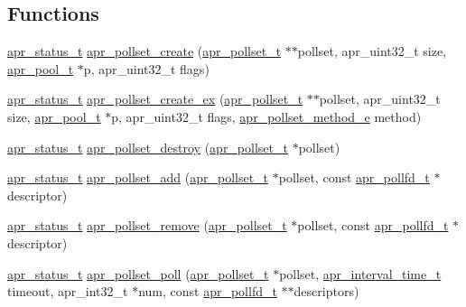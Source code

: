 \subsection*{Functions}
\begin{DoxyCompactItemize}
\item 
\hyperlink{group__apr__errno_gaf76ee4543247e9fb3f3546203e590a6c}{apr\-\_\-status\-\_\-t} \hyperlink{group__apr__poll_ga4ca4056a19daee8fe94ddba100fe2326}{apr\-\_\-pollset\-\_\-create} (\hyperlink{group__apr__poll_ga680da1f10ac5ef75efc503a9d15b8906}{apr\-\_\-pollset\-\_\-t} $\ast$$\ast$pollset, apr\-\_\-uint32\-\_\-t size, \hyperlink{group__apr__pools_gaf137f28edcf9a086cd6bc36c20d7cdfb}{apr\-\_\-pool\-\_\-t} $\ast$p, apr\-\_\-uint32\-\_\-t flags)
\item 
\hyperlink{group__apr__errno_gaf76ee4543247e9fb3f3546203e590a6c}{apr\-\_\-status\-\_\-t} \hyperlink{group__apr__poll_ga9448a2d756868aa1c6dbc9726a2e32b5}{apr\-\_\-pollset\-\_\-create\-\_\-ex} (\hyperlink{group__apr__poll_ga680da1f10ac5ef75efc503a9d15b8906}{apr\-\_\-pollset\-\_\-t} $\ast$$\ast$pollset, apr\-\_\-uint32\-\_\-t size, \hyperlink{group__apr__pools_gaf137f28edcf9a086cd6bc36c20d7cdfb}{apr\-\_\-pool\-\_\-t} $\ast$p, apr\-\_\-uint32\-\_\-t flags, \hyperlink{group__apr__poll_gabe6f1238ea45e9425fa052e2788e4a29}{apr\-\_\-pollset\-\_\-method\-\_\-e} method)
\item 
\hyperlink{group__apr__errno_gaf76ee4543247e9fb3f3546203e590a6c}{apr\-\_\-status\-\_\-t} \hyperlink{group__apr__poll_gaa06c538d3fea9d860374043aff9450b2}{apr\-\_\-pollset\-\_\-destroy} (\hyperlink{group__apr__poll_ga680da1f10ac5ef75efc503a9d15b8906}{apr\-\_\-pollset\-\_\-t} $\ast$pollset)
\item 
\hyperlink{group__apr__errno_gaf76ee4543247e9fb3f3546203e590a6c}{apr\-\_\-status\-\_\-t} \hyperlink{group__apr__poll_ga4ec50bf9a11c6b60927c51b81412f5b9}{apr\-\_\-pollset\-\_\-add} (\hyperlink{group__apr__poll_ga680da1f10ac5ef75efc503a9d15b8906}{apr\-\_\-pollset\-\_\-t} $\ast$pollset, const \hyperlink{structapr__pollfd__t}{apr\-\_\-pollfd\-\_\-t} $\ast$descriptor)
\item 
\hyperlink{group__apr__errno_gaf76ee4543247e9fb3f3546203e590a6c}{apr\-\_\-status\-\_\-t} \hyperlink{group__apr__poll_ga3c99c06e142d6b6b789eeb6086122e3a}{apr\-\_\-pollset\-\_\-remove} (\hyperlink{group__apr__poll_ga680da1f10ac5ef75efc503a9d15b8906}{apr\-\_\-pollset\-\_\-t} $\ast$pollset, const \hyperlink{structapr__pollfd__t}{apr\-\_\-pollfd\-\_\-t} $\ast$descriptor)
\item 
\hyperlink{group__apr__errno_gaf76ee4543247e9fb3f3546203e590a6c}{apr\-\_\-status\-\_\-t} \hyperlink{group__apr__poll_ga6b31d7b3a7b2d356370403dd2b79ecf3}{apr\-\_\-pollset\-\_\-poll} (\hyperlink{group__apr__poll_ga680da1f10ac5ef75efc503a9d15b8906}{apr\-\_\-pollset\-\_\-t} $\ast$pollset, \hyperlink{group__apr__time_gaae2129185a395cc393f76fabf4f43e47}{apr\-\_\-interval\-\_\-time\-\_\-t} timeout, apr\-\_\-int32\-\_\-t $\ast$num, const \hyperlink{structapr__pollfd__t}{apr\-\_\-pollfd\-\_\-t} $\ast$$\ast$descriptors)
$$
\end{DoxyCompactItemize}
